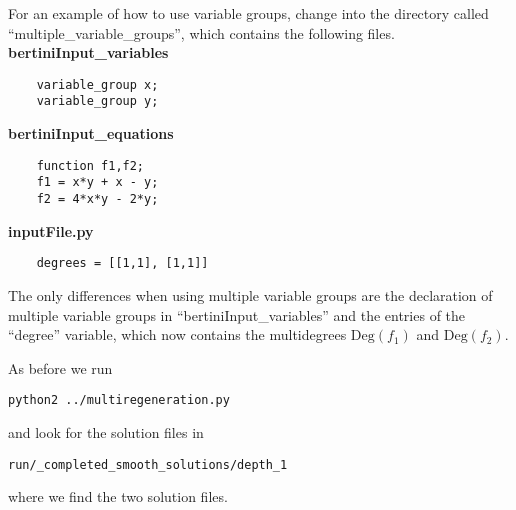 \documentclass[12pt]{article}
\theoremstyle{definition}
\newcommand{\Deg}{\text{Deg}}
\begin{document}
For an example of how to use variable groups, change into the directory 
called ``multiple\_variable\_groups'', which contains the following 
files.\\

\noindent \textbf{bertiniInput\_variables}
\begin{leftbar}
\vspace{-10pt} 
\begin{verbatim}
    variable_group x; 
    variable_group y; 
\end{verbatim}\vspace{-10pt} 
\end{leftbar}

\noindent \textbf{bertiniInput\_equations}
\begin{leftbar}
\vspace{-10pt} 
\begin{verbatim}
    function f1,f2;
    f1 = x*y + x - y;
    f2 = 4*x*y - 2*y;
\end{verbatim}\vspace{-10pt} 
\end{leftbar}


\noindent \textbf{inputFile.py}
\begin{leftbar}
\vspace{-10pt} 
\begin{verbatim}
    degrees = [[1,1], [1,1]]
\end{verbatim}\vspace{-10pt} 
\end{leftbar}

The only differences when using multiple variable groups are the 
declaration of multiple variable groups in ``bertiniInput\_variables'' 
and the entries of the ``degree'' variable, which now contains the 
multidegrees $\Deg(f_1)$ and $\Deg(f_2)$.

 As before we run
\begin{leftbar}
\vspace{-10pt} 
\begin{verbatim}
python2 ../multiregeneration.py
\end{verbatim}\vspace{-10pt} 
\end{leftbar}
\noindent and look for the solution files in 
\begin{leftbar}
\vspace{-10pt} 
\begin{verbatim}
run/_completed_smooth_solutions/depth_1
\end{verbatim}\vspace{-10pt} 
\end{leftbar}
\noindent where we find the two solution files.
\end{document}
